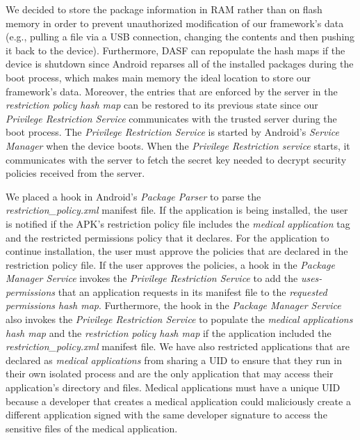 We decided to store the package information in RAM rather than on flash
memory in order to prevent unauthorized modification of our
framework's data (e.g., pulling a file via a USB connection,
changing the contents and then pushing it back to the device).
Furthermore, DASF can repopulate the hash maps if the device
is shutdown since Android reparses all of the installed packages during the
boot process, which makes main memory the ideal location to store our
framework's data.  Moreover, the entries that are enforced by the
server in the \textit{restriction policy hash map} can be
restored to its previous state since our \textit{Privilege Restriction Service}
communicates with the trusted server during the boot process.  The \textit{Privilege Restriction Service} is started by Android's \textit{Service Manager} when the
device boots.  When the \textit{Privilege Restriction service} starts, it
communicates with the server to fetch the secret key needed to decrypt
security policies received from the server.  

We placed a hook in Android's \textit{Package Parser} to parse the
\textit{restriction\_policy.xml} manifest file.  If the application
is being installed,
the user is notified if the APK's restriction policy file includes the
\textit{medical application} tag and the restricted permissions policy
that it declares. For the application to continue installation, the
user must approve the policies that are declared in the restriction
policy file.  If the user approves the policies, a hook in the
\textit{Package Manager Service} invokes the \textit{Privilege Restriction
 Service} to add the \textit{uses-permissions} that an application requests
in its manifest file to the \textit{requested permissions hash map}.
Furthermore, the hook in the \textit{Package Manager Service} also
invokes the \textit{Privilege Restriction Service} to populate the
\textit{medical applications hash map} and the
\textit{restriction policy hash map} if the application included
the \textit{restriction\_policy.xml} manifest file.  We have
also restricted applications that are declared as
\textit{medical applications} from sharing a UID to ensure
that they run in their own isolated process and are the only application
that may access their application's directory and files.  Medical
applications must have a unique UID because a developer that creates
a medical application could maliciously create a different application
signed with the same developer signature to access the sensitive files
of the medical application.

